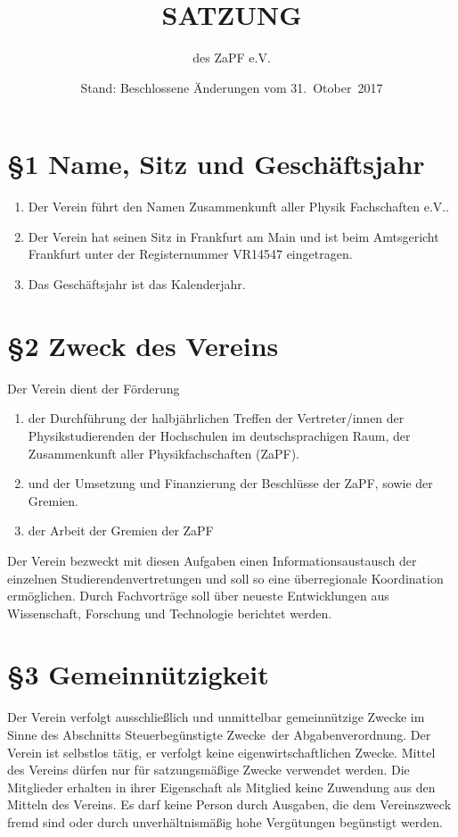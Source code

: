 \documentclass[11pt,ngerman]{article}
\begin{document}
\title{SATZUNG}
\date{Stand: Beschlossene Änderungen vom 31.~Otober~2017}

\author{des \textquotedbl{}ZaPF
e.V.\textquotedbl{}}

\maketitle



\section*{§1 Name, Sitz und Geschäftsjahr}
\begin{enumerate}
\item Der Verein führt den Namen \glqq Zusammenkunft aller Physik Fachschaften e.V.\grqq.
\item Der Verein hat seinen Sitz in Frankfurt am Main und ist beim Amtsgericht Frankfurt unter der Registernummer VR14547 eingetragen.
\item Das Geschäftsjahr ist das Kalenderjahr.
\end{enumerate}


\section*{§2 Zweck des Vereins}
Der Verein dient der Förderung 
\begin{enumerate}
	\item der Durchführung der halbjährlichen Treffen der Vertreter/innen der Physikstudierenden der Hochschulen im deutschsprachigen Raum, der Zusammenkunft aller Physikfachschaften (ZaPF).
	\item und der Umsetzung und Finanzierung der Beschlüsse der ZaPF, sowie der Gremien.
	\item der Arbeit der Gremien der ZaPF
\end{enumerate}
Der Verein bezweckt mit diesen Aufgaben einen Informationsaustausch der einzelnen Studierendenvertretungen und soll so eine überregionale Koordination ermöglichen. Durch Fachvorträge soll über neueste Entwicklungen aus Wissenschaft, Forschung und Technologie berichtet werden.


\newpage

\section*{§3 Gemeinnützigkeit}
Der Verein verfolgt ausschließlich und unmittelbar gemeinnützige Zwecke im Sinne des Abschnitts \glqq Steuerbegünstigte Zwecke\grqq\ der Abgabenverordnung. Der Verein ist selbstlos tätig, er verfolgt keine eigenwirtschaftlichen Zwecke. Mittel des Vereins dürfen nur für satzungsmäßige Zwecke verwendet werden. Die Mitglieder erhalten in
ihrer Eigenschaft als Mitglied keine Zuwendung aus den Mitteln des Vereins. Es darf keine Person durch Ausgaben, die dem Vereinszweck fremd sind oder durch unverhältnismäßig hohe Vergütungen begünstigt werden.
\end{document}
